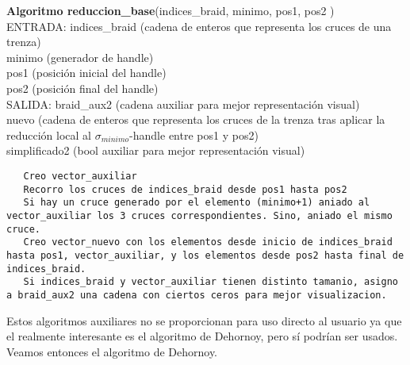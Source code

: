 \begin{alg}
	\textbf{Algoritmo reduccion\_base}(indices\_braid, minimo, pos1, pos2 )\\
	ENTRADA: indices\_braid (cadena de enteros que representa los cruces de una trenza)\\
	\hspace*{2.2cm} minimo (generador de handle) \\
	\hspace*{2.2cm} pos1 (posición inicial del handle) \\
	\hspace*{2.2cm} pos2 (posición final del handle)\\
	SALIDA: \hspace{0.4cm} braid\_aux2 (cadena auxiliar para mejor representación visual) \\
	\hspace*{2.2cm} nuevo (cadena de enteros que representa los cruces de la trenza tras aplicar la reducción local al $\sigma_{minimo}$-handle entre pos1 y pos2)\\
	\hspace*{2.2cm} simplificado2 (bool auxiliar para mejor representación visual)
	
\begin{lstlisting}
   Creo vector_auxiliar
   Recorro los cruces de indices_braid desde pos1 hasta pos2
   Si hay un cruce generado por el elemento (minimo+1) aniado al vector_auxiliar los 3 cruces correspondientes. Sino, aniado el mismo cruce. 
   Creo vector_nuevo con los elementos desde inicio de indices_braid hasta pos1, vector_auxiliar, y los elementos desde pos2 hasta final de indices_braid.
   Si indices_braid y vector_auxiliar tienen distinto tamanio, asigno a braid_aux2 una cadena con ciertos ceros para mejor visualizacion.
\end{lstlisting}
\end{alg}


Estos algoritmos auxiliares no se proporcionan para uso directo al usuario ya que el realmente interesante es el algoritmo de Dehornoy, pero sí podrían ser usados. Veamos entonces el algoritmo de Dehornoy.\\

